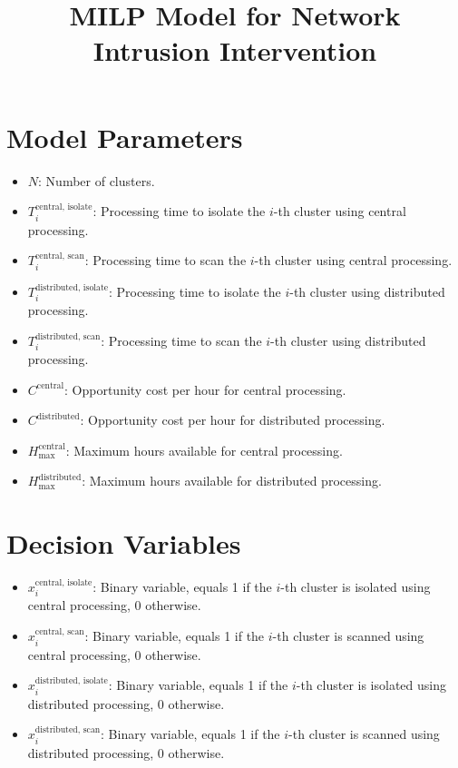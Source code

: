 \documentclass{article}
\begin{document}
\title{MILP Model for Network Intrusion Intervention}
\date{}
\maketitle

\section*{Model Parameters}

\begin{itemize}
    \item $N$: Number of clusters.
    \item $T_{i}^{\text{central, isolate}}$: Processing time to isolate the $i$-th cluster using central processing.
    \item $T_{i}^{\text{central, scan}}$: Processing time to scan the $i$-th cluster using central processing.
    \item $T_{i}^{\text{distributed, isolate}}$: Processing time to isolate the $i$-th cluster using distributed processing.
    \item $T_{i}^{\text{distributed, scan}}$: Processing time to scan the $i$-th cluster using distributed processing.
    \item $C^{\text{central}}$: Opportunity cost per hour for central processing.
    \item $C^{\text{distributed}}$: Opportunity cost per hour for distributed processing.
    \item $H^{\text{central}}_{\text{max}}$: Maximum hours available for central processing.
    \item $H^{\text{distributed}}_{\text{max}}$: Maximum hours available for distributed processing.
\end{itemize}

\section*{Decision Variables}

\begin{itemize}
    \item $x_{i}^{\text{central, isolate}}$: Binary variable, equals 1 if the $i$-th cluster is isolated using central processing, 0 otherwise.
    \item $x_{i}^{\text{central, scan}}$: Binary variable, equals 1 if the $i$-th cluster is scanned using central processing, 0 otherwise.
    \item $x_{i}^{\text{distributed, isolate}}$: Binary variable, equals 1 if the $i$-th cluster is isolated using distributed processing, 0 otherwise.
    \item $x_{i}^{\text{distributed, scan}}$: Binary variable, equals 1 if the $i$-th cluster is scanned using distributed processing, 0 otherwise.
\end{itemize}
\end{document}
